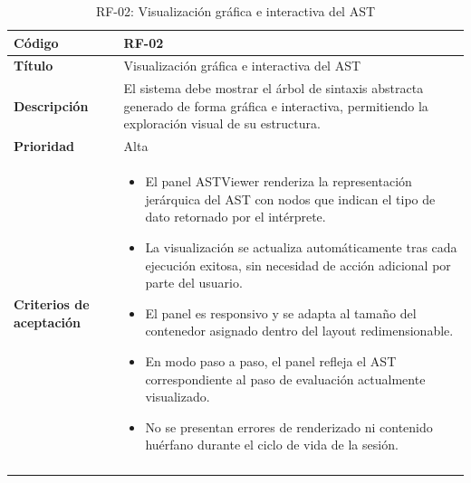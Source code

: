 \begin{longtable}{|>{\bfseries}p{3cm}|p{11cm}|}
\hline
\textbf{Código} & RF-02 \\
\hline
\textbf{Título} & Visualización gráfica e interactiva del AST \\
\hline
\textbf{Descripción} & El sistema debe mostrar el árbol de sintaxis abstracta generado de forma gráfica e interactiva, permitiendo la exploración visual de su estructura. \\
\hline
\textbf{Prioridad} & Alta \\
\hline
\textbf{Criterios de aceptación} &
\begin{itemize}[leftmargin=*,topsep=2pt,itemsep=1pt,parsep=0pt]
    \item El panel ASTViewer renderiza la representación jerárquica del AST con nodos que indican el tipo de dato retornado por el intérprete.
    \item La visualización se actualiza automáticamente tras cada ejecución exitosa, sin necesidad de acción adicional por parte del usuario.
    \item El panel es responsivo y se adapta al tamaño del contenedor asignado dentro del layout redimensionable.
    \item En modo paso a paso, el panel refleja el AST correspondiente al paso de evaluación actualmente visualizado.
    \item No se presentan errores de renderizado ni contenido huérfano durante el ciclo de vida de la sesión.
\end{itemize} \\
\hline
\caption{RF-02: Visualización gráfica e interactiva del AST}
\label{tab:rf02}
\end{longtable}


